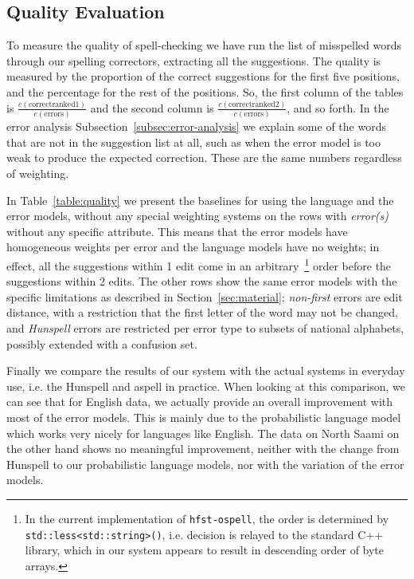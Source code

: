 \documentclass[a4paper,12pt]{article}
\begin{document}
\subsection{Quality Evaluation}
\label{subsec:quality}

To measure the quality of spell-checking we have run the list of misspelled
words through our spelling correctors, extracting all the suggestions. The
quality is measured by the proportion of the correct suggestions for the first
five positions, and the percentage for the rest of the positions. So, the first
column of the tables is $\frac{c(\mathrm{correct ranked
1})}{c(\mathrm{errors})}$ and the second column is $\frac{c(\mathrm{correct
ranked 2})}{c(\mathrm{errors})}$, and so forth. In the error analysis
Subsection~\ref{subsec:error-analysis} we explain some of the words that are
not in the suggestion list at all, such as when the error model is too weak to
produce the expected correction. These are the same numbers regardless of
weighting.

In Table~\ref{table:quality} we present the baselines for using the language
and the error models, without any special weighting systems on the rows with
\emph{error(s)} without any specific attribute. This means that the error
models have homogeneous weights per error and the language models have no
weights; in effect, all the suggestions within 1 edit come in an
arbitrary~\footnote{In the current implementation of \texttt{hfst-ospell}, the
    order is determined by \texttt{std::less<std::string>()}, i.e. decision is
relayed to the standard C++ library, which in our system appears to result in
descending order of byte arrays.} order before the suggestions within 2 edits.
The other rows show the same error models with the specific limitations as
described in Section~\ref{sec:material}; \emph{non-first} errors are edit
distance, with a restriction that the first letter of the word may not be changed, and
\emph{Hunspell} errors are restricted per error type to subsets of national
alphabets, possibly extended with a confusion set.

Finally we compare the results of our system with the actual systems in
everyday use, i.e. the Hunspell and aspell in practice. When looking at this
comparison, we can see that for English data, we actually provide an overall
improvement with most of the error models. This is mainly due to the
probabilistic language model which works very nicely for languages like
English. The data on North Saami on the other hand shows no meaningful
improvement, neither with the change from Hunspell to our probabilistic language
models, nor with the variation of the error models.
\end{document}
